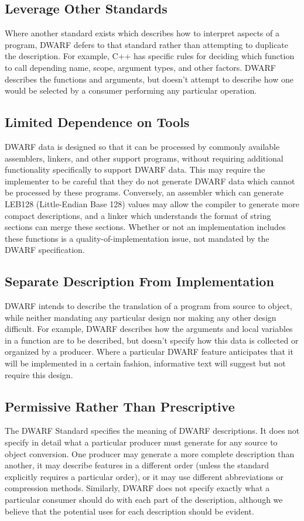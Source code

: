 \subsection{Leverage Other Standards}
Where another standard exists which describes how to interpret 
aspects of a program, DWARF defers to that standard rather than 
attempting to duplicate the description.  For example, C++ has 
specific rules for deciding which function to call depending 
name, scope, argument types, and other factors.  DWARF describes 
the functions and arguments, but doesn't attempt to describe 
how one would be selected by a consumer performing any particular 
operation.

\subsection{Limited Dependence on Tools}
DWARF data is designed so that it can be processed by commonly 
available assemblers, linkers, and other support programs, 
without requiring additional functionality specifically to 
support DWARF data.  This may require the implementer to be 
careful that they do not generate DWARF data which cannot be 
processed by these programs.  Conversely, an assembler which 
can generate LEB128 (Little-Endian Base 128) 
values may allow the compiler to generate 
more compact descriptions, and a linker which understands the 
format of string sections can merge these sections.  Whether 
or not an implementation includes these functions is a 
quality-of-implementation issue, not mandated by the DWARF 
specification.

\subsection{Separate Description From Implementation}
DWARF intends to describe the translation of a program from 
source to object, while neither mandating any particular design 
nor making any other design difficult.  For example, DWARF 
describes how the arguments and local variables in a function 
are to be described, but doesn't specify how this data is 
collected or organized by a producer.  Where a particular DWARF 
feature anticipates that it will be implemented in a certain 
fashion, informative text will suggest but not require this design.

\subsection{Permissive Rather Than Prescriptive}
The DWARF Standard specifies the meaning of DWARF descriptions. It does not
specify in detail what a particular producer 
\bb
must
\eb
generate for any source to
object conversion.  One producer may generate a more complete description
than another, it may describe features in a different order (unless the 
standard explicitly requires a particular order), or it may use
different abbreviations or compression methods.  Similarly, DWARF does not
specify exactly what a particular consumer should do with each part of the
description, although we believe that the potential uses for each description
should be evident.

